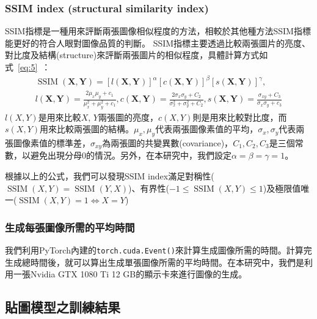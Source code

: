 \documentclass[a4paper, 12pt]{article}
\begin{document}
\subsubsection{SSIM index (structural similarity index)\cite{wang2004image}}
SSIM指標是一種用來評斷兩張圖像相似程度的方法，相較於其他種方法SSIM指標能更好的符合人眼對圖像品質的判斷。
SSIM指標主要透過比較兩張圖片的亮度、對比度及結構(structure)來評斷兩張圖片的相似程度，具體計算方式如式~\ref{eq:5}~：
\begin{equation}
\begin{array}{l}
\operatorname{SSIM}(\mathbf{X}, \mathbf{Y})=[l(\mathbf{X}, \mathbf{Y})]^{\alpha}[c(\mathbf{X}, \mathbf{Y})]^{\beta}[s(\mathbf{X}, \mathbf{Y})]^{\gamma}, \\
l(\mathbf{X}, \mathbf{Y})=\frac{2 \mu_{x} \mu_{y}+c_{1}}{\mu_{x}^{2}+\mu_{y}^{2}+c_{1}}, c(\mathbf{X}, \mathbf{Y})=\frac{2 \sigma_{x} \sigma_{y}+C_{2}}{\sigma_{x}^{2}+\sigma_{y}^{2}+C_{2}}, s(\mathbf{X}, \mathbf{Y})=\frac{\sigma_{x y}+C_{3}}{\sigma_{x} \sigma_{y}+c_{3}}
\end{array}
\label{eq:5}
\end{equation}
$l(X,Y)$是用來比較$X$, $Y$兩張圖的亮度，$c(X,Y)$則是用來比較對比度，而$s(X,Y)$用來比較兩張圖的結構。$\mu_x,\mu_y$代表兩張圖像素值的平均，$\sigma_x,\sigma_y$代表兩張圖像素值的標準差，$\sigma_{xy}$為兩張圖的共變異數(covariance)，$C_1,C_2,C_3$是三個常數，以避免出現分母0的情況。另外，在本研究中，我們設定$\alpha=\beta=\gamma=1$。

根據以上的公式，我們可以發現SSIM index滿足對稱性($\operatorname{SSIM}(X,Y)=\operatorname{SSIM}(Y,X)$)、有界性($-1\leq \operatorname{SSIM}(X,Y)\leq 1$)及極限值唯一($\operatorname{SSIM}(X,Y)=1 \Longleftrightarrow X=Y$)

\subsubsection{生成每張圖像所需的平均時間}

我們利用PyTorch內建的\texttt{torch.cuda.Event()}來計算生成圖像所需的時間。計算完生成總時間後，就可以算出生成單張圖像所需的平均時間。在本研究中，我們是利用一張Nvidia GTX 1080 Ti 12 GB的顯示卡來進行圖像的生成。

\subsection{貼圖模型之訓練結果}
\end{document}
